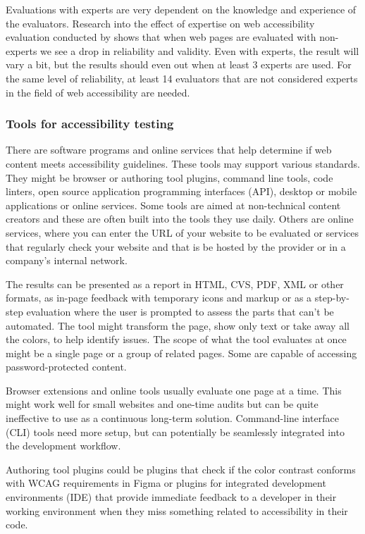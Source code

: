 \documentclass{master_thesis}
\begin{document}
Evaluations with experts are very dependent on the knowledge and experience of the evaluators. Research into the effect of expertise on web accessibility evaluation conducted by \citeauthor{Brajnik2011} shows that when web pages are evaluated with non-experts we see a drop in reliability and validity. Even with experts, the result will vary a bit, but the results should even out when at least 3 experts are used. For the same level of reliability, at least 14 evaluators that are not considered experts in the field of web accessibility are needed. \citep{Brajnik2011}

\subsubsection{Tools for accessibility testing}

There are software programs and online services that help determine if web content meets accessibility guidelines. These tools may support various standards. They might be browser or authoring tool plugins, command line tools, code linters, open source application programming interfaces (API), desktop or mobile applications or online services. Some tools are aimed at non-technical content creators and these are often built into the tools they use daily. Others are online services, where you can enter the URL of your website to be evaluated or services that regularly check your website and that is be hosted by the provider or in a company's internal network. \citep{AbouZahra2017}

The results can be presented as a report in HTML, CVS, PDF, XML or other formats, as in-page feedback with temporary icons and markup or as a step-by-step evaluation where the user is prompted to assess the parts that can't be automated. The tool might transform the page, show only text or take away all the colors, to help identify issues. The scope of what the tool evaluates at once might be a single page or a group of related pages. Some are capable of accessing password-protected content. \citep{AbouZahra2017}

Browser extensions and online tools usually evaluate one page at a time. This might work well for small websites and one-time audits but can be quite ineffective to use as a continuous long-term solution. Command-line interface (CLI) tools need more setup, but can potentially be seamlessly integrated into the development workflow.

Authoring tool plugins could be plugins that check if the color contrast conforms with WCAG requirements in Figma or plugins for integrated development environments (IDE) that provide immediate feedback to a developer in their working environment when they miss something related to accessibility in their code.
\end{document}
